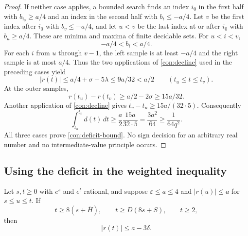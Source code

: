 \begin{proof}
If neither case applies, a bounded search finds an index $i_0$ in the
first half with $b_{i_0}\geq a/4$ and an index in the second half with
$b_i\leq-a/4$.  Let $v$ be the first index after $i_0$ with
$b_v\leq-a/4$, and let $u<v$ be the last index at or after $i_0$
with $b_u\geq a/4$.  These are minima and maxima of finite decidable
sets.  For $u<i<v$,
\[
 -a/4<b_i<a/4.
\]
For each $i$ from $u$ through $v-1$, the left sample is at least
$-a/4$ and the right sample is at most $a/4$.  Thus the two applications
of \eqref{con:decline} used in the preceding cases yield
\[
 |r(t)|\leq a/4+\sigma+5\lambda\leq9a/32<a/2
       \qquad(t_u\leq t\leq t_v).
\]
At the outer samples,
\[
 r(t_u)-r(t_v)\geq a/2-2\sigma\geq15a/32.
\]
Another application of \eqref{con:decline} gives
$t_v-t_u\geq15a/(32\cdot5)$.  Consequently
\[
 \int_{t_u}^{t_v}d(t)\,dt
 \geq\frac a2\frac{15a}{32\cdot5}
 =\frac{3a^2}{64}\geq\frac1{64q^2}.
\]
All three cases prove \eqref{con:deficit-bound}.  No sign decision for
an arbitrary real number and no intermediate-value principle occurs.
\end{proof}

\subsection{Using the deficit in the weighted inequality}

\begin{lemma}\label{con:one-step}
Let $s,t\geq0$ with $e^s$ and $e^t$ rational, and suppose
$\varepsilon\leq a\leq4$ and $|r(u)|\leq a$ for $s\leq u\leq t$.
If
\begin{equation}
 t\geq8(s+\overline H),\qquad
 t\geq D(8s+S),\qquad t\geq2,
 \label{con:step-threshold}
\end{equation}
then
\begin{equation}
 |r(t)|\leq a-3\delta.\label{con:step-margin}
\end{equation}
\end{lemma}


